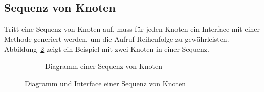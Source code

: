 \documentclass[../InterneDSLs.tex]{subfiles}
\begin{document}
\subsection{Sequenz von Knoten}
Tritt eine Sequenz von Knoten auf, muss für jeden Knoten ein Interface mit einer Methode generiert werden, um die Aufruf-Reihenfolge zu gewährleisten. Abbildung~\ref{FIG:SequenceNode} zeigt ein Beispiel mit zwei Knoten in einer Sequenz.
\begin{figure}[ht]
\centering
  \begin{subfigure}[c]{0.49\textwidth}
    \caption{Diagramm einer Sequenz von Knoten}
    \label{FIG:DiagramSequenceNode}
  \end{subfigure}
  \begin{subfigure}[c]{0.49\textwidth}
    
  \end{subfigure}
  \caption{Diagramm und Interface einer Sequenz von Knoten}
  \label{FIG:SequenceNode}
\end{figure}
\end{document}
